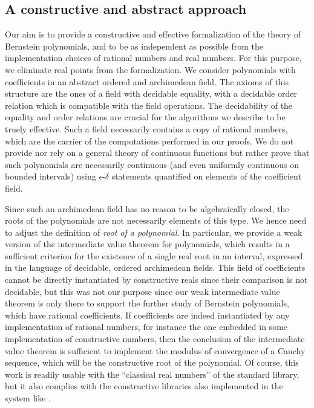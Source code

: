 \documentclass{mscs}
\begin{document}
\subsection{A constructive and abstract approach}
Our aim is to provide a constructive and effective formalization of
the theory of Bernstein polynomials, and to be as independent as
possible from the implementation choices of rational numbers and
real numbers. For this
purpose, we eliminate real points from the formalization. 
We consider polynomials with coefficients in an abstract ordered and
archimedean field. The axioms of this structure are the ones of a
field with decidable equality, with a decidable order relation which is
compatible with the field operations. The decidability of the equality
and order relations are crucial for the algorithms we describe to be
truely effective. Such a field necessarily contains a copy of rational
numbers, which are the carrier of the computations performed in our
proofs. We do not provide
nor rely on a general theory of continuous functions but rather prove
that such polynomials are necessarily continuous (and even uniformly
continuous on bounded intervals) using $\epsilon$-$\delta$ statements
quantified on elements of the coefficient field.

Since such an archimedean field has no reason
to be algebraically closed, the roots of the polynomials are not
necessarily elements of this type. We hence need to adjust the
definition of {\em root of a polynomial}. In particular, we provide a
weak version of the intermediate value theorem for polynomials, which
results in a sufficient criterion for the existence of a single real root in
an interval, expressed in the language of decidable, ordered
archimedean fields. This field of coefficients cannot be directly
instantiated by constructive reals since their comparison is not
decidable, but this was not our purpose since our weak intermediate
value theorem is only there to support the further study of Bernstein
polynomials, which have rational coefficients. If coefficients are
indeed instantiated by any implementation of
rational numbers, for instance the one embedded in some implementation
of constructive numbers, then the conclusion of the intermediate
value theorem is sufficient to implement the modulus of convergence of
a Cauchy sequence, which will be the constructive root of the
polynomial. Of course, this work is readily usable  with the
``classical real numbers'' of the standard \Coq{} library, but it also
complies with the constructive libraries also implemented in the \Coq{}
system like \cite{DBLP:conf/mkm/Cruz-FilipeGW04, russellreals,
  russellcoqreals}.
\end{document}
